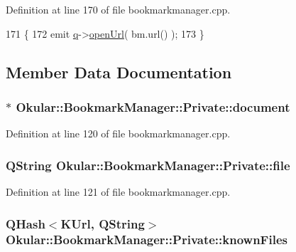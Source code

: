 Definition at line 170 of file bookmarkmanager.\+cpp.


\begin{DoxyCode}
171 \{
172     emit \hyperlink{classBookmarkManager_1_1Private_af306f5f96c025b5b5131bdd769575cb7}{q}->\hyperlink{classOkular_1_1BookmarkManager_a4141e9880af774f72d8e0616ca4a6392}{openUrl}( bm.url() );
173 \}
\end{DoxyCode}


\subsection{Member Data Documentation}
\hypertarget{classBookmarkManager_1_1Private_a308b94ea2abb1e9c630fc534ec403903}{
\subsubsection[{document}]{$\ast$ Okular\+::\+Bookmark\+Manager\+::\+Private\+::document}}\label{classBookmarkManager_1_1Private_a308b94ea2abb1e9c630fc534ec403903}


Definition at line 120 of file bookmarkmanager.\+cpp.

\hypertarget{classBookmarkManager_1_1Private_a9df93b157b356c3381caf65de2adeb25}{
\subsubsection[{file}]{\setlength{\rightskip}{0pt plus 5cm}Q\+String Okular\+::\+Bookmark\+Manager\+::\+Private\+::file}}\label{classBookmarkManager_1_1Private_a9df93b157b356c3381caf65de2adeb25}


Definition at line 121 of file bookmarkmanager.\+cpp.

\hypertarget{classBookmarkManager_1_1Private_ad4ef503c3bf977fc59f04ea5c89b2968}{
\subsubsection[{known\+Files}]{\setlength{\rightskip}{0pt plus 5cm}Q\+Hash$<$K\+Url, Q\+String$>$ Okular\+::\+Bookmark\+Manager\+::\+Private\+::known\+Files}}\label{classBookmarkManager_1_1Private_ad4ef503c3bf977fc59f04ea5c89b2968}


